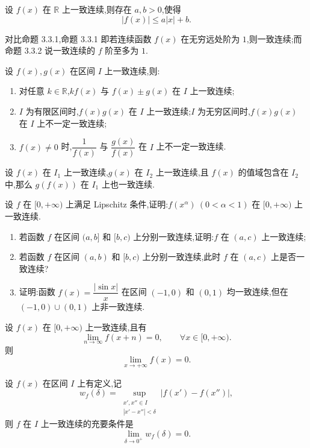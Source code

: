 \documentclass[../数学分析培优讲义.tex]{subfiles}
\begin{document}
\begin{proposition}
设 $f(x)$ 在 $\mathbb{R}$ 上一致连续,则存在 $a,b>0$,使得
\[
    |f(x)|\leq a|x|+b.
\]
\end{proposition}

\begin{remark}
对比命题 3.3.1,命题 3.3.1 即若连续函数 $f(x)$ 在无穷远处阶为 $1$,则一致连续;而命题 3.3.2 说一致连续的 $f$ 阶至多为 $1$.
\end{remark}

\begin{proposition}
设 $f(x),g(x)$ 在区间 $I$ 上一致连续,则:
\begin{enumerate}[label=(\arabic*)]
    \item 对任意 $k\in\mathbb{R}$,$kf(x)$ 与 $f(x)\pm g(x)$ 在 $I$ 上一致连续;
    \item $I$ 为有限区间时,$f(x)g(x)$ 在 $I$ 上一致连续;$I$ 为无穷区间时,$f(x)g(x)$ 在 $I$ 上不一定一致连续;
    \item $f(x)\neq0$ 时,$\dfrac{1}{f(x)}$ 与 $\dfrac{g(x)}{f(x)}$ 在 $I$ 上不一定一致连续.
\end{enumerate}
\end{proposition}

\begin{proposition}
设 $f(x)$ 在 $I_1$ 上一致连续,$g(x)$ 在 $I_2$ 上一致连续,且 $f(x)$ 的值域包含在 $I_2$ 中,那么 $g(f(x))$ 在 $I_1$ 上也一致连续.
\end{proposition}

\begin{example}
设 $f$ 在 $\lbrack 0,+\infty)$ 上满足 Lipschitz 条件,证明:$f(x^\alpha)\ (0<\alpha<1)$ 在 $\lbrack 0,+\infty)$ 上一致连续.
\end{example}
\exampleblank

\begin{example}[区间合并]
\begin{enumerate}[label=(\arabic*)]
    \item 若函数 $f$ 在区间 $(a,b\rbrack$ 和 $\lbrack b,c)$ 上分别一致连续,证明:$f$ 在 $(a,c)$ 上一致连续;
    \item 若函数 $f$ 在区间 $(a,b)$ 和 $\lbrack b,c)$ 上分别一致连续,此时 $f$ 在 $(a,c)$ 上是否一致连续?
    \item 证明:函数 $f(x)=\dfrac{|\sin x|}{x}$ 在区间 $(-1,0)$ 和 $(0,1)$ 均一致连续,但在 $(-1,0)\cup(0,1)$ 上非一致连续.
\end{enumerate}
\end{example}
\exampleblank

\begin{example}
设 $f(x)$ 在 $\lbrack 0,+\infty)$ 上一致连续,且有
\[
    \lim\limits_{n\to\infty}f(x+n)=0,
    \qquad \forall x\in\lbrack 0,+\infty).
\]
则
\[
    \lim\limits_{x\to+\infty}f(x)=0.
\]
\end{example}
\exampleblank

\begin{example}
设 $f(x)$ 在区间 $I$ 上有定义,记
\[
    w_f(\delta)
    =\sup\limits_{\substack{x',x''\in I\\|x'-x''|<\delta}}
    |f(x')-f(x'')|,
\]
则 $f$ 在 $I$ 上一致连续的充要条件是
\[
    \lim\limits_{\delta\to0^+}w_f(\delta)=0.
\]
\end{example}
\exampleblank
\end{document}
